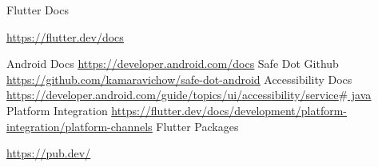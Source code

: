 \documentclass[12pt]{report}
\renewcommand{\_}{\kern-1.5pt\textunderscore\kern-1.5pt}
\begin{document}
\begin{multicols}{2}
\vspace{\baselineskip}
\begin{thebibliography}{99}
{\fontsize{10pt}{12.0pt}\selectfont Flutter Docs}
\begin{justify}
\href{https://flutter.dev/docs}{\textcolor[HTML]{1155CC}{\ul{https://flutter.dev/docs}}}
\end{justify}
{\fontsize{10pt}{12.0pt}\selectfont Android Docs \href{https://developer.android.com/docs}{\textcolor[HTML]{1155CC}{\ul{https://developer.android.com/docs}}}}
{\fontsize{10pt}{12.0pt}\selectfont Safe Dot Github \href{https://github.com/kamaravichow/safe-dot-android}{\textcolor[HTML]{1155CC}{\ul{https://github.com/kamaravichow/safe-dot-android}}}}
{\fontsize{10pt}{12.0pt}\selectfont Accessibility Docs \href{https://developer.android.com/guide/topics/ui/accessibility/service#java}{\textcolor[HTML]{1155CC}{\ul{https://developer.android.com/guide/topics/ui/accessibility/service$\#$ java}}}}
{\fontsize{10pt}{12.0pt}\selectfont Platform Integration \href{https://flutter.dev/docs/development/platform-integration/platform-channels}{\textcolor[HTML]{1155CC}{\ul{https://flutter.dev/docs/development/platform-integration/platform-channels}}}}
{\fontsize{10pt}{12.0pt}\selectfont Flutter Packages}
\end{thebibliography}
\href{https://pub.dev/}{\textcolor[HTML]{1155CC}{\ul{https://pub.dev/}}}

\vspace{\baselineskip}

\end{multicols}
\printbibliography
\end{document}
